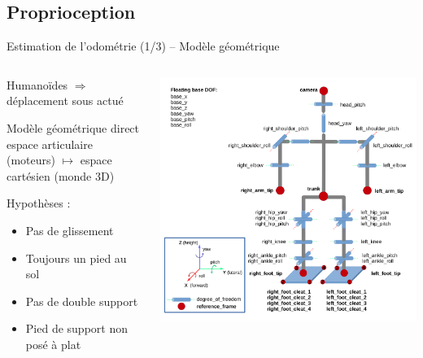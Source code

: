 
\subsection{Proprioception}

\begin{frame}{Estimation de l'odométrie (1/3) -- Modèle géométrique}
    \begin{columns}
        \begin{column}{0.45\linewidth}
            Humanoïdes $\Rightarrow$ déplacement \og sous actué \fg\\
            \vspace{1.0em}
            \begin{block}{Modèle géométrique direct}
                espace articulaire (moteurs) $\longmapsto$ espace cartésien (monde 3D)
            \end{block}
            \vspace{1.0em}
            Hypothèses :
            \begin{itemize}
                \item Pas de glissement
                \item Toujours un pied au sol
                \item Pas de double support
                \item Pied de support non posé à plat
            \end{itemize}
        \end{column}
        \begin{column}{0.55\linewidth}
            \centering
            \includegraphics[type=pdf,ext=.pdf,read=.pdf,width=1.0\linewidth]{../schema/humanoid}
        \end{column}
    \end{columns}
\end{frame}

